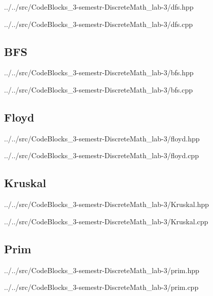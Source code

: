 
{../../src/CodeBlocks_3-semestr-DiscreteMath_lab-3/dfs.hpp}


{../../src/CodeBlocks_3-semestr-DiscreteMath_lab-3/dfs.cpp}

\newpage

\subsection{BFS}


{../../src/CodeBlocks_3-semestr-DiscreteMath_lab-3/bfs.hpp}


{../../src/CodeBlocks_3-semestr-DiscreteMath_lab-3/bfs.cpp}

\newpage

\subsection{Floyd}


{../../src/CodeBlocks_3-semestr-DiscreteMath_lab-3/floyd.hpp}


{../../src/CodeBlocks_3-semestr-DiscreteMath_lab-3/floyd.cpp}

\newpage

\subsection{Kruskal}


{../../src/CodeBlocks_3-semestr-DiscreteMath_lab-3/Kruskal.hpp}


{../../src/CodeBlocks_3-semestr-DiscreteMath_lab-3/Kruskal.cpp}

\newpage

\subsection{Prim}


{../../src/CodeBlocks_3-semestr-DiscreteMath_lab-3/prim.hpp}


{../../src/CodeBlocks_3-semestr-DiscreteMath_lab-3/prim.cpp}


